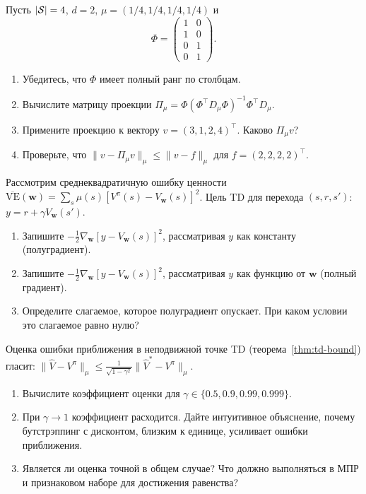 \begin{exercise}
\label{ex:projection-compute}
Пусть $|\mathcal{S}| = 4$, $d = 2$, $\mu = (1/4, 1/4, 1/4, 1/4)$ и
\[
\Phi = \begin{pmatrix} 1 & 0 \\ 1 & 0 \\ 0 & 1 \\ 0 & 1 \end{pmatrix}.
\]
\begin{enumerate}
\item Убедитесь, что $\Phi$ имеет полный ранг по столбцам.
\item Вычислите матрицу проекции $\Pi_\mu = \Phi(\Phi^\top D_\mu \Phi)^{-1} \Phi^\top D_\mu$.
\item Примените проекцию к вектору $v = (3, 1, 2, 4)^\top$.  Каково $\Pi_\mu v$?
\item Проверьте, что $\|v - \Pi_\mu v\|_\mu \leq \|v - f\|_\mu$ для $f = (2, 2, 2, 2)^\top$.
\end{enumerate}
\end{exercise}

\begin{exercise}
\label{ex:semi-gradient-not-gradient}
Рассмотрим среднеквадратичную ошибку ценности $\overline{\mathrm{VE}}(\mathbf{w}) = \sum_s \mu(s)[V^\pi(s) - V_\mathbf{w}(s)]^2$.  Цель TD для перехода $(s, r, s')$: $y = r + \gamma V_\mathbf{w}(s')$.
\begin{enumerate}
\item Запишите $-\frac{1}{2}\nabla_\mathbf{w}[y - V_\mathbf{w}(s)]^2$, рассматривая $y$ как константу (полуградиент).
\item Запишите $-\frac{1}{2}\nabla_\mathbf{w}[y - V_\mathbf{w}(s)]^2$, рассматривая $y$ как функцию от $\mathbf{w}$ (полный градиент).
\item Определите слагаемое, которое полуградиент опускает.  При каком условии это слагаемое равно нулю?
\end{enumerate}
\end{exercise}

\begin{exercise}
\label{ex:td-bound}
Оценка ошибки приближения в неподвижной точке TD (теорема~\ref{thm:td-bound}) гласит: $\|\hat{V} - V^\pi\|_\mu \leq \frac{1}{\sqrt{1-\gamma^2}}\|\hat{V}^* - V^\pi\|_\mu$.
\begin{enumerate}
\item Вычислите коэффициент оценки для $\gamma \in \{0.5, 0.9, 0.99, 0.999\}$.
\item При $\gamma \to 1$ коэффициент расходится.  Дайте интуитивное объяснение, почему бутстрэппинг с дисконтом, близким к единице, усиливает ошибки приближения.
\item Является ли оценка точной в общем случае?  Что должно выполняться в МПР и признаковом наборе для достижения равенства?
\end{enumerate}
\end{exercise}

